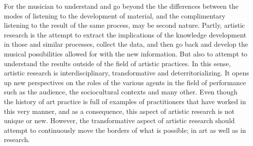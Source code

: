 \documentclass[11pt]{article}
\begin{document}
For the musician to understand and go beyond the
the differences between the modes of listening to the development of
material, and the complimentary listening to the result of the same
process, may be second nature. Partly, artistic research is the
attempt to extract the implications of the knowledge development in those
and similar processes, collect the data, and then
go back and develop the musical possibilities allowed for with the new
information. But also to attempt to understand the results outside of the field of artistic practices.
In this sense, artistic
research is interdisciplinary, transformative and deterritorializing. It opens up new perspectives on the roles
of the various agents in the field of performance such as the
audience, the sociocultural contexts and many other. Even though the history of
art practice is full of examples of practitioners that have worked in
this very manner, and as a consequence, this aspect of artistic
research is not unique or new. However, the transformative aspect of artistic
research should attempt to continuously move the borders of what is
possible; in art as well as in research.


\printbibliography
\end{document}
